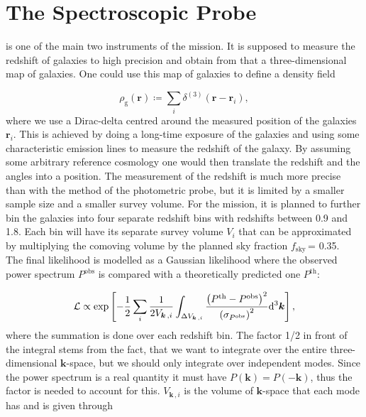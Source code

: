 \documentclass[../main.tex]{subfiles}
\begin{document}
\chapter{The Spectroscopic Probe}

is one of the main two instruments of the \Euclid mission. It is supposed to measure the redshift of galaxies to high precision and obtain from that a three-dimensional
map of galaxies. One could use this map of galaxies to define a density field 

\begin{equation}
    \rho_\mathrm{g}(\boldsymbol{r}) \coloneqq \sum_i \delta^{(3)}(\boldsymbol{r}-\boldsymbol{r}_i),
\end{equation}
where we use a Dirac-delta centred around the measured position of the galaxies $\boldsymbol{r}_i$. This is achieved by doing a long-time exposure of the galaxies and using some characteristic emission lines to measure the redshift of the galaxy. By assuming some arbitrary reference cosmology one would then translate the redshift and the angles into a position. The measurement of the redshift is much more precise than with the method of the photometric probe, but it is limited by a smaller sample size and a smaller survey volume. For the \Euclid mission, it is planned to further bin the galaxies into four separate redshift bins with redshifts between 0.9 and 1.8. Each bin will have its separate survey volume $V_i$ that can be approximated by multiplying the comoving volume by the planned sky fraction $f_\mathrm{sky}\,$= 0.35.\\
The final likelihood is modelled as a Gaussian likelihood where the observed power spectrum $P^\mathrm{obs}$ is compared with a theoretically predicted one $P^\mathrm{th}$: 

\begin{equation}
   \mathcal{L} \propto \exp\left[-\frac{1}{2} \sum_i \frac{1}{2 V_{\boldsymbol{k}\,,i}} \int_{\Delta V_{\boldsymbol{k}\,,i}} \frac{\left(P^\mathrm{th}-P^\mathrm{obs}\right)^2}{\left(\sigma_{P^\mathrm{obs}}\right)^2} \mathrm{d}^3 \boldsymbol{k} \right],
\end{equation} 
where the summation is done over each redshift bin. The factor 1/2 in front of the integral stems from the fact, that we want to integrate over the entire three-dimensional $\boldsymbol{k}$-space, but we should only integrate over independent modes. Since the power spectrum is a real quantity it must have $P(\boldsymbol{k})=P(-\boldsymbol{k})$, thus the factor is needed to account for this. $V_{\boldsymbol{k}\,,i}$ is the volume of $\boldsymbol{k}$-space that each mode has and is given through
\end{document}
